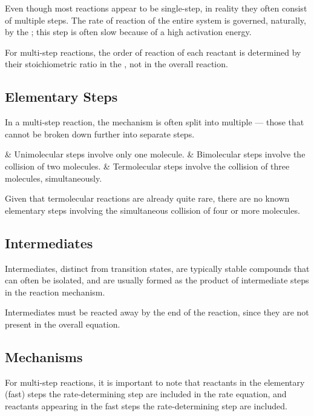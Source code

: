 		Even though most reactions appear to be single-step, in reality they often consist of multiple steps. The rate of reaction of the entire
		system is governed, naturally, by the ; this step is often slow because of a high activation energy.

		For multi-step reactions, the order of reaction of each reactant is determined by their stoichiometric ratio in the
		, not in the overall reaction.

		\subsection{Elementary Steps}

			In a multi-step reaction, the mechanism is often split into multiple  --- those that cannot be broken down
			further into separate steps.

			\begin{bulletlist}
				& Unimolecular steps involve only one molecule.
				& Bimolecular steps involve the collision of two molecules.
				& Termolecular steps involve the collision of three molecules, simultaneously.
			\end{bulletlist}

			Given that termolecular reactions are already quite rare, there are no known elementary steps involving the simultaneous
			collision of four or more molecules.



		\subsection{Intermediates}

			Intermediates, distinct from transition states, are typically stable compounds that can often be isolated, and are usually formed
			as the product of intermediate steps in the reaction mechanism.

			Intermediates must be reacted away by the end of the reaction, since they are not present in the overall equation.



		\subsection{Mechanisms}

			For multi-step reactions, it is important to note that reactants in the elementary (fast) steps  the
			rate-determining step are included in the rate equation, and reactants appearing in the fast steps  the
			rate-determining step are  included.

